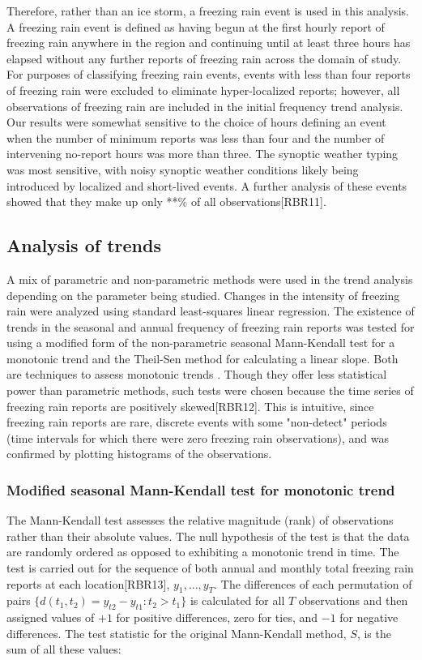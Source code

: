 \documentclass[twocol]{ametsoc}
\begin{document}
Therefore, rather than an ice storm, a freezing rain event is used in this analysis. A freezing rain event is defined as having begun at the first hourly report of freezing rain anywhere in the region and continuing until at least three hours has elapsed without any further reports of freezing rain across the domain of study. For purposes of classifying freezing rain events, events with less than four reports of freezing rain were excluded to eliminate hyper-localized reports; however, all observations of freezing rain are included in the initial frequency trend analysis. Our results were somewhat sensitive to the choice of hours defining an event when the number of minimum reports was less than four and the number of intervening no-report hours was more than three. The synoptic weather typing was most sensitive, with noisy synoptic weather conditions likely being introduced by localized and short-lived events. A further analysis of these events showed that they make up only **\% of all observations[RBR11].

\subsection{Analysis of trends}
A mix of parametric and non-parametric methods were used in the trend analysis depending on the parameter being studied. Changes in the intensity of freezing rain were analyzed using standard least-squares linear regression. The existence of trends in the seasonal and annual frequency of freezing rain reports was tested for using a modified form of the non-parametric seasonal Mann-Kendall test for a monotonic trend and the Theil-Sen method for calculating a linear slope. Both are techniques to assess monotonic trends \citep{chandler2011statistical}. Though they offer less statistical power than parametric methods, such tests were chosen because the time series of freezing rain reports are positively skewed[RBR12]. This is intuitive, since freezing rain reports are rare, discrete events with some "non-detect" periods (time intervals for which there were zero freezing rain observations), and was confirmed by plotting histograms of the observations.

\subsubsection{Modified seasonal Mann-Kendall test for monotonic trend}
The Mann-Kendall test assesses the relative magnitude (rank) of observations rather than their absolute values. The null hypothesis of the test is that the data are randomly ordered as opposed to exhibiting a monotonic trend in time. The test is carried out for the sequence of both annual and monthly total freezing rain reports at each location[RBR13], $y_1,\ldots,y_T$. The differences of each permutation of pairs $\{d(t_1,t_2)=y_{t2}-y_{t1}:t_2>t_1\}$ is calculated for all $T$ observations and then assigned values of $+1$ for positive differences, zero for ties, and $-1$ for negative differences. The test statistic for the original Mann-Kendall method, $S$, is the sum of all these values:
\end{document}
